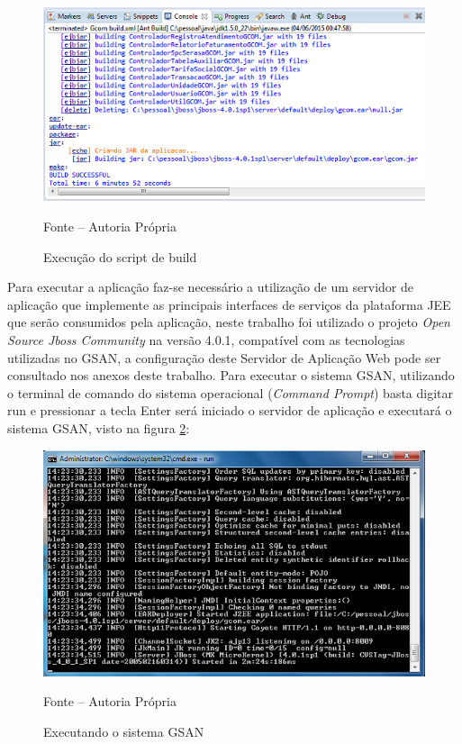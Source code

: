 \begin{figure}[H]
	\centering
	\includegraphics{figuras/build_ant.png}
	\caption{Execução do script de build}	
	\label{figura:execucaoScriptBuild}
	Fonte – Autoria Própria
\end{figure}

Para executar a aplicação faz-se necessário a utilização de um servidor de aplicação que implemente as principais interfaces de serviços da plataforma JEE que serão consumidos pela aplicação, neste trabalho foi utilizado o projeto \textit{Open Source Jboss Community} na versão 4.0.1, compatível com as tecnologias utilizadas no GSAN, a configuração deste Servidor de Aplicação Web pode ser consultado nos anexos deste trabalho.
Para executar o sistema GSAN, utilizando o terminal de comando do sistema operacional (\textit{Command Prompt}) basta digitar run e pressionar a tecla Enter será iniciado o servidor de aplicação e executará o sistema GSAN, visto na figura \ref{figura:execucaoSistemaGSAN}:


\begin{figure}[!htb]
	\centering
	\includegraphics{figuras/executando_jboss.png}
	\caption{Executando o sistema GSAN}	
	\label{figura:execucaoSistemaGSAN}
	Fonte – Autoria Própria
\end{figure}


